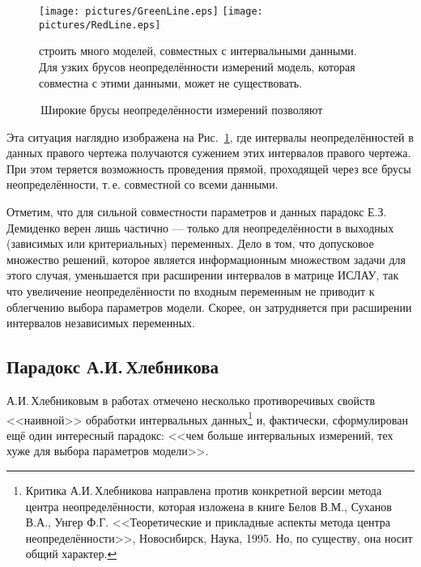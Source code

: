 \documentclass[a5paper,openany]{book}
\begin{document}
  
\begin{figure}[htb] 
\centering\small  
\texttt{[image: pictures/GreenLine.eps]}
\hspace{2mm}
\texttt{[image: pictures/RedLine.eps]}
\caption{\,Широкие брусы неопределённости измерений позволяют} 
строить много моделей,  совместных с интервальными данными. \\ 
Для узких брусов неопределённости измерений модель, которая \\
совместна с этими данными, может не существовать.  
\label{DemiParadoxPic}
\end{figure}
  
    
Эта ситуация наглядно изображена на Рис.~\ref{DemiParadoxPic}, где интервалы 
неопределённостей в данных правого чертежа получаются сужением этих интервалов правого 
чертежа. При этом теряется возможность проведения прямой, проходящей через все брусы 
неопределённости, т.\,е. совместной со всеми данными. 
  
Отметим, что для сильной совместности параметров и данных парадокс Е.З.\,Демиденко 
верен лишь частично --- только для неопределённости в выходных (зависимых или 
критериальных) переменных. Дело в том, что допусковое множество решений, которое 
является информационным множеством задачи для этого случая, уменьшается при расширении 
интервалов в матрице ИСЛАУ, так что увеличение  неопределённости по входным переменным 
не приводит к облегчению выбора параметров модели. Скорее, он затрудняется при 
расширении интервалов независимых переменных. 
  
  
\subsection{Парадокс А.И.\,Хлебникова}  
  
А.И.\,Хлебниковым в работах \cite{Khlebnikov1996,Khlebnikov1999} отмечено несколько 
противоречивых свойств <<наивной>> обработки интервальных данных\footnote{Критика 
А.И.\,Хлебникова направлена против конкретной версии метода центра неопределённости, 
которая изложена в книге Белов В.М., Суханов В.А., Унгер Ф.Г. <<Теоретические и 
прикладные аспекты метода центра неопределённости>>, Новосибирск, Наука, 1995. 
Но, по существу, она носит общий характер.} и, фактически, сформулирован ещё один 
интересный парадокс: <<чем больше интервальных измерений, тех хуже для выбора 
параметров модели>>.                           
  
\end{document}
